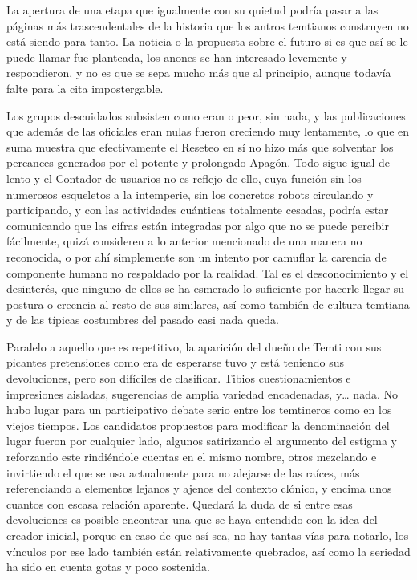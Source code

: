 \documentclass[
]{book}
\begin{document}
La apertura de una etapa que igualmente con su quietud podría pasar a las páginas más trascendentales de la historia que los antros temtianos construyen no está siendo para tanto. La noticia o la propuesta sobre el futuro si es que así se le puede llamar fue planteada, los anones se han interesado levemente y respondieron, y no es que se sepa mucho más que al principio, aunque todavía falte para la cita impostergable.

Los grupos descuidados subsisten como eran o peor, sin nada, y las publicaciones que además de las oficiales eran nulas fueron creciendo muy lentamente, lo que en suma muestra que efectivamente el Reseteo en sí no hizo más que solventar los percances generados por el potente y prolongado Apagón. Todo sigue igual de lento y el Contador de usuarios no es reflejo de ello, cuya función sin los numerosos esqueletos a la intemperie, sin los concretos robots circulando y participando, y con las actividades cuánticas totalmente cesadas, podría estar comunicando que las cifras están integradas por algo que no se puede percibir fácilmente, quizá consideren a lo anterior mencionado de una manera no reconocida, o por ahí simplemente son un intento por camuflar la carencia de componente humano no respaldado por la realidad. Tal es el desconocimiento y el desinterés, que ninguno de ellos se ha esmerado lo suficiente por hacerle llegar su postura o creencia al resto de sus similares, así como también de cultura temtiana y de las típicas costumbres del pasado casi nada queda.

Paralelo a aquello que es repetitivo, la aparición del dueño de Temti con sus picantes pretensiones como era de esperarse tuvo y está teniendo sus devoluciones, pero son difíciles de clasificar. Tibios cuestionamientos e impresiones aisladas, sugerencias de amplia variedad encadenadas, y\ldots{} nada. No hubo lugar para un participativo debate serio entre los temtineros como en los viejos tiempos. Los candidatos propuestos para modificar la denominación del lugar fueron por cualquier lado, algunos satirizando el argumento del estigma y reforzando este rindiéndole cuentas en el mismo nombre, otros mezclando e invirtiendo el que se usa actualmente para no alejarse de las raíces, más referenciando a elementos lejanos y ajenos del contexto clónico, y encima unos cuantos con escasa relación aparente. Quedará la duda de si entre esas devoluciones es posible encontrar una que se haya entendido con la idea del creador inicial, porque en caso de que así sea, no hay tantas vías para notarlo, los vínculos por ese lado también están relativamente quebrados, así como la seriedad ha sido en cuenta gotas y poco sostenida.
\end{document}
